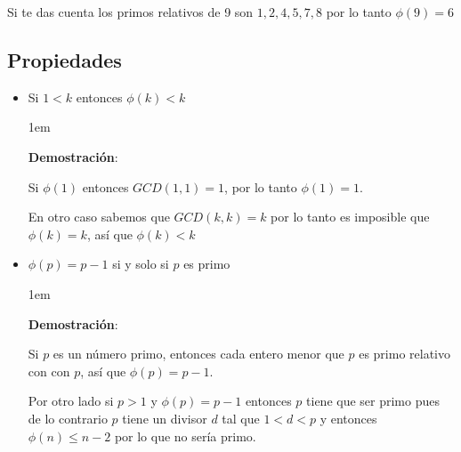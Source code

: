 \documentclass[12pt, fleqn]{report}                             %
\newenvironment{SmallIndentation}[1][0.75em]                    %
    {\begin{adjustwidth}{#1}{}\begin{footnotesize}}                 %
    {\end{footnotesize}\end{adjustwidth}}                           %
\begin{document}
            Si te das cuenta los primos relativos de 9 son $1,2,4,5,7,8$
            por lo tanto $\phi(9) = 6$





        \clearpage
        \subsection{Propiedades}

            \begin{itemize}

                \item Si $1 < k$ entonces $\phi(k) < k$
                
                    \begin{SmallIndentation}[1em]
                        \textbf{Demostración}:

                        Si $\phi(1)$ entonces $GCD(1,1) = 1$, por lo tanto
                        $\phi(1)=1$.

                        En otro caso sabemos que $GCD(k, k) = k$ por lo tanto
                        es imposible que $\phi(k)=k$, así que $\phi(k) < k$

                    \end{SmallIndentation}


                \item $\phi(p) = p - 1$ si y solo si $p$ es primo

                    \begin{SmallIndentation}[1em]
                        \textbf{Demostración}:

                        Si $p$ es un número primo, entonces cada entero menor
                        que $p$ es primo relativo con con $p$, así que 
                        $\phi(p) = p-1$.

                        Por otro lado si $p > 1$ y $\phi(p) = p-1$ entonces $p$
                        tiene que ser primo pues de lo contrario $p$ tiene
                        un divisor $d$ tal que $1<d<p$ y entonces
                        $\phi(n) \leq n-2$ por lo que no sería primo.

                    \end{SmallIndentation}



\end{itemize}
\end{document}
